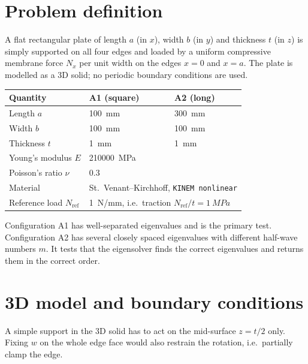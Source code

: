 \documentclass[11pt,a4paper]{report}
\begin{document}
\section{Problem definition}

A flat rectangular plate of length $a$ (in $x$), width $b$ (in $y$) and
thickness $t$ (in $z$) is simply supported on all four edges and loaded by a
uniform compressive membrane force $N_x$ per unit width on the edges $x=0$
and $x=a$. The plate is modelled as a 3D solid; no periodic boundary
conditions are used.

\begin{center}
\begin{tabular}{@{}lll@{}}
\toprule
Quantity & A1 (square) & A2 (long) \\
\midrule
Length $a$ & \SI{100}{mm} & \SI{300}{mm} \\
Width $b$ & \SI{100}{mm} & \SI{100}{mm} \\
Thickness $t$ & \SI{1}{mm} & \SI{1}{mm} \\
Young's modulus $E$ & \multicolumn{2}{l}{\SI{210000}{MPa}} \\
Poisson's ratio $\nu$ & \multicolumn{2}{l}{0.3} \\
Material & \multicolumn{2}{l}{St.\ Venant--Kirchhoff, \texttt{KINEM nonlinear}} \\
Reference load $N_\text{ref}$ & \multicolumn{2}{l}{\SI{1}{N/mm}, i.e.\ traction $N_\text{ref}/t = \SI{1}{MPa}$} \\
\bottomrule
\end{tabular}
\end{center}

Configuration A1 has well-separated eigenvalues and is the primary test.
Configuration A2 has several closely spaced eigenvalues with different
half-wave numbers $m$. It tests that the eigensolver finds the correct
eigenvalues and returns them in the correct order.

\section{3D model and boundary conditions}

A simple support in the 3D solid has to act on the mid-surface
$z = t/2$ only. Fixing $w$ on the whole edge face would also restrain the
rotation, i.e.\ partially clamp the edge.
\end{document}
